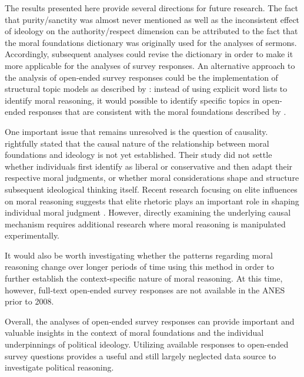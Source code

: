 \documentclass[12pt]{article}
\begin{document}
The results presented here provide several directions for future research. The fact that purity/sanctity was almost never mentioned as well as the inconsistent effect of ideology on the authority/respect dimension can be attributed to the fact that the moral foundations dictionary was originally used for the analyses of sermons. Accordingly, subsequent analyses could revise the dictionary in order to make it more applicable for the analyses of survey responses. An alternative approach to the analysis of open-ended survey responses could be the implementation of structural topic models as described by \citet{roberts2014structural}: instead of using explicit word lists to identify moral reasoning, it would possible to identify specific topics in open-ended responses that are consistent with the moral foundations described by \citet{haidt2008moral} \citep[see also][]{lin2008joint}.

One important issue that remains unresolved is the question of causality. \citet{graham2009liberals} rightfully stated that the causal nature of the relationship between moral foundations and ideology is not yet established. Their study did not settle whether individuals first identify as liberal or conservative and then adapt their respective moral judgments, or whether moral considerations shape and structure subsequent ideological thinking itself. Recent research focusing on elite influences on moral reasoning suggests that elite rhetoric plays an important role in shaping individual moral judgment \citep[see for example][]{clifford2013words,clifford2015concerns}. However, directly examining the underlying causal mechanism requires additional research where moral reasoning is manipulated experimentally.

It would also be worth investigating whether the patterns regarding moral reasoning change over longer periods of time using this method in order to further establish the context-specific nature of moral reasoning. At this time, however, full-text open-ended survey responses are not available in the ANES prior to 2008.

Overall, the analyses of open-ended survey responses can provide important and valuable insights in the context of moral foundations and the individual underpinnings of political ideology. Utilizing available responses to open-ended survey questions provides a useful and still largely neglected data source to investigate political reasoning.

\end{document}
